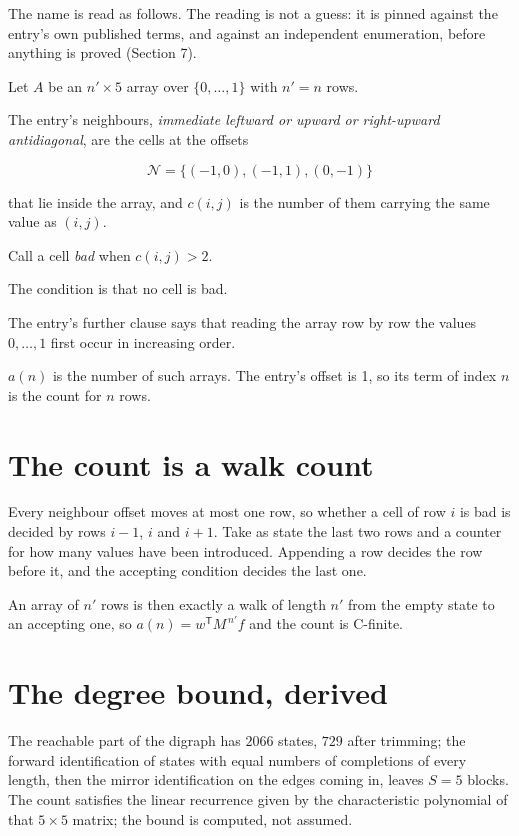 \documentclass[11pt]{article}
\theoremstyle{definition}
\begin{document}
The name is read as follows. The reading is not a guess: it is pinned against the entry's own published terms, and against an independent enumeration, before anything is proved (Section 7).

Let $A$ be an $n' \times 5$ array over $\{0,\dots,1\}$ with $n' = n$ rows.

The entry's neighbours, {\itshape immediate leftward or upward or right-upward antidiagonal}, are the cells at the offsets

\[\mathcal{N} = \{(-1,0), (-1,1), (0,-1)\}\]

that lie inside the array, and $c(i,j)$ is the number of them carrying the same value as $(i,j)$.

Call a cell {\itshape bad} when $c(i,j) > 2$.

The condition is that no cell is bad.

The entry's further clause says that reading the array row by row the values $0,\dots,1$ first occur in increasing order.

$a(n)$ is the number of such arrays. The entry's offset is 1, so its term of index $n$ is the count for $n$ rows.

\section{The count is a walk count}

Every neighbour offset moves at most one row, so whether a cell of row $i$ is bad is decided by rows $i-1$, $i$ and $i+1$. Take as state the last two rows and a counter for how many values have been introduced. Appending a row decides the row before it, and the accepting condition decides the last one.

An array of $n'$ rows is then exactly a walk of length $n'$ from the empty state to an accepting one, so $a(n) = w^{\mathsf T}M^{\,n'}f$ and the count is C-finite.

\section{The degree bound, derived}

The reachable part of the digraph has $2066$ states, $729$ after trimming; the forward identification of states with equal numbers of completions of every length, then the mirror identification on the edges coming in, leaves $S = 5$ blocks. The count satisfies the linear recurrence given by the characteristic polynomial of that $5\times5$ matrix; the bound is computed, not assumed.
\end{document}
